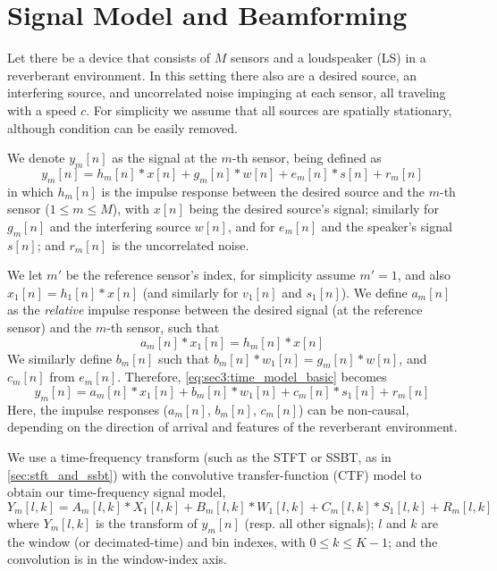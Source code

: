 \section{Signal Model and Beamforming}
\label{sec:signal_model}

Let there be a device that consists of $M$ sensors and a loudspeaker (LS) in a reverberant environment. In this setting there also are a desired source, an interfering source, and uncorrelated noise impinging at each sensor, all traveling with a speed $c$. For simplicity we assume that all sources are spatially stationary, although condition can be easily removed.

We denote $y_m[n]$ as the signal at the $m$-th sensor, being defined as
\begin{equation}
	\label{eq:sec3:time_model_basic}
	y_m[n] = h_m[n] \ast x[n] + g_m[n] \ast w[n] + e_m[n] \ast s[n] + r_m[n]
\end{equation}
in which $h_m[n]$ is the impulse response between the desired source and the $m$-th sensor ($1 \leq m \leq M$), with $x[n]$ being the desired source's signal; similarly for $g_m[n]$ and the interfering source $w[n]$, and for $e_m[n]$ and the speaker's signal $s[n]$; and $r_m[n]$ is the uncorrelated noise.

We let $m'$ be the reference sensor's index, for simplicity assume $m' = 1$, and also $x_1[n] = h_1[n] \ast x[n]$ (and similarly for $v_1[n]$ and $s_1[n]$). We define $a_m[n]$ as the \textit{relative} impulse response between the desired signal (at the reference sensor) and the $m$-th sensor, such that
\begin{equation}
	a_m[n] \ast x_1[n] = h_m[n] \ast x[n]
\end{equation}
We similarly define $b_m[n]$ such that $b_m[n] \ast w_1[n] = g_m[n] \ast w[n]$, and $c_m[n]$ from $e_m[n]$. Therefore, \cref{eq:sec3:time_model_basic} becomes
\begin{equation}
	\label{eq:sec3:time_model_relative}
	y_m[n] = a_m[n] \ast x_1[n] + b_m[n] \ast w_1[n] + c_m[n] \ast s_1[n] + r_m[n]
\end{equation}
Here, the impulse responses ($a_m[n]$, $b_m[n]$, $c_m[n]$) can be non-causal, depending on the direction of arrival and features of the reverberant environment.

We use a time-frequency transform (such as the STFT or SSBT, as in \cref{sec:stft_and_ssbt}) with the convolutive transfer-function (CTF) model \cite{talmon_relative_2009} to obtain our time-frequency signal model,
\begin{equation}
	\label{eq:sec3:time-freq_model_conv}
	Y_m[l,k] = A_m[l,k] \ast X_1[l,k] + B_m[l,k] \ast W_1[l,k] + C_m[l,k] \ast S_1[l,k] + R_m[l,k]
\end{equation}
where $Y_m[l,k]$ is the transform of $y_m[n]$ (resp. all other signals); $l$ and $k$ are the window (or decimated-time) and bin indexes, with $0 \leq k \leq K-1$; and the convolution is in the window-index axis.

